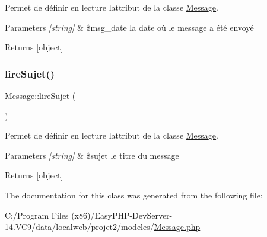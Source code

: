 Permet de définir en lecture l\textquotesingle{}attribut de la classe \hyperlink{class_message}{Message}. 


\begin{DoxyParams}{Parameters}
{\em \mbox{[}string\mbox{]}} & \$msg\+\_\+date la date où le message a été envoyé \\
\hline
\end{DoxyParams}
\begin{DoxyReturn}{Returns}
\mbox{[}object\mbox{]} 
\end{DoxyReturn}
\mbox{\label{class_message_a252f800e40fd051c1ad5b2c0a450f1c2}} 
\subsubsection{\texorpdfstring{lire\+Sujet()}{lireSujet()}}
{\footnotesize\ttfamily Message\+::lire\+Sujet (\begin{DoxyParamCaption}{ }\end{DoxyParamCaption})}



Permet de définir en lecture l\textquotesingle{}attribut de la classe \hyperlink{class_message}{Message}. 


\begin{DoxyParams}{Parameters}
{\em \mbox{[}string\mbox{]}} & \$sujet le titre du message \\
\hline
\end{DoxyParams}
\begin{DoxyReturn}{Returns}
\mbox{[}object\mbox{]} 
\end{DoxyReturn}


The documentation for this class was generated from the following file\+:\begin{DoxyCompactItemize}
\item 
C\+:/\+Program Files (x86)/\+Easy\+P\+H\+P-\/\+Dev\+Server-\/14.\+V\+C9/data/localweb/projet2/modeles/\hyperlink{_message_8php}{Message.\+php}\end{DoxyCompactItemize}
